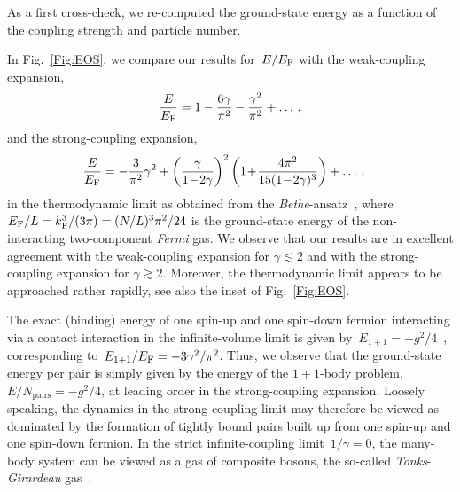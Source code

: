 \documentclass[pra,aps,groupedaddress,floatfix,twocolumn,superscriptaddress,showpacs,nofootinbib]{revtex4-1}
\newcommand{\be}{\begin{eqnarray}}
\newcommand{\ee}{\end{eqnarray}}
\newcommand{\kf}{k_\textnormal{F}}
\begin{document}
{
As a first cross-check, we re-computed the ground-state energy
as a function of the coupling strength and particle number.

In Fig.~\ref{Fig:EOS},
we compare our results for~$E/E_{\rm F}$ with the weak-coupling expansion,
%
\be
\frac{E}{E_{\rm F}}= 1 - \frac{6\gamma}{\pi^2} - \frac{\gamma^2}{\pi^2} + \dots\,,
\ee
%
and the strong-coupling expansion,
%
\be
\!\!\!\!\!\!\frac{E}{E_{\rm F}} = -\frac{3}{\pi^2}\gamma^2
+ \left(\frac{\gamma}{1\!-\!2\gamma}\right)^2\left( 1 \!+\! \frac{4\pi^2}{15(1\!-\!2\gamma)^3}\right)
+\dots\,,\label{eq:scexp}
\ee
%
in the thermodynamic limit as obtained from the {\it Bethe}-ansatz~\cite{wadati, tracyWidom},
where $E_{\rm F}/L=\kf^3/(3\pi)=(N/L)^3\pi^2/24$ is the ground-state energy of the non-interacting two-component
{\it Fermi} gas.
We observe that our results are in excellent agreement
with the weak-coupling expansion for $\gamma \lesssim 2$ and with
the strong-coupling expansion for  $\gamma \gtrsim 2$.
Moreover, the thermodynamic limit appears to be approached rather rapidly,
see also the inset of Fig.~\ref{Fig:EOS}.

The exact (binding) energy of one spin-up and one spin-down fermion
interacting via a contact interaction in the infinite-volume limit is given by~$E_{1+1}=-g^2/4$~\cite{Griffiths},
corresponding to~$E_{1+1}/E_{\rm F}=- 3\gamma^2/\pi^2$.
Thus, we observe that the ground-state energy per pair is simply
given by the energy of the $1+1$-body problem,~$E/N_{\text{pairs}}=-g^2/4$, at leading order in the strong-coupling
expansion. Loosely speaking, the dynamics in the
strong-coupling limit may therefore be viewed as dominated
by the formation of tightly bound pairs built up from one spin-up and one spin-down fermion.
In the strict infinite-coupling limit~$1/\gamma =0$,
the many-body system {can be viewed as a gas of composite bosons, the} so-called {\it Tonks}-{\it Girardeau} gas~\cite{tggas}.

}
\end{document}
